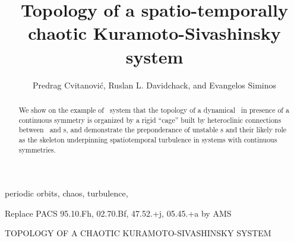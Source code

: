 \documentclass{siamltex}
\begin{document}
                \title{
Topology of a spatio-temporally chaotic Kuramoto-Sivashinsky system
                 }
                  \author{
Predrag Cvitanovi\'c\footnotemark[1],
Ruslan L. Davidchack\footnotemark[2],
    and
Evangelos Siminos\footnotemark[1]
                    }
                  

                \maketitle

\renewcommand{\thefootnote}{\fnsymbol{footnote}}
\renewcommand{\thefootnote}{\arabic{footnote}}
  
                \begin{abstract}
We show on the example of \KS\ system
that the topology of a dynamical \statesp\ in presence of 
a continuous symmetry is organized by 
a rigid ``cage'' built by heteroclinic connections
between \eqva\ and \rpo s, and demonstrate the
preponderance of unstable \rpo s and their likely
role as the skeleton underpinning spatiotemporal turbulence in
systems with continuous symmetries. 
                \end{abstract}

\begin{keywords}
periodic orbits, chaos, turbulence, {\KSe}
\end{keywords}

\begin{AMS}
    Replace PACS 95.10.Fh, 02.70.Bf, 47.52.+j, 05.45.+a by AMS
\end{AMS}

\pagestyle{myheadings}
\thispagestyle{plain}
         {TOPOLOGY OF A CHAOTIC KURAMOTO-SIVASHINSKY SYSTEM}










    \PublicPrivate{%
        }{%
\appendix

\newpage
    } %
\end{document}
